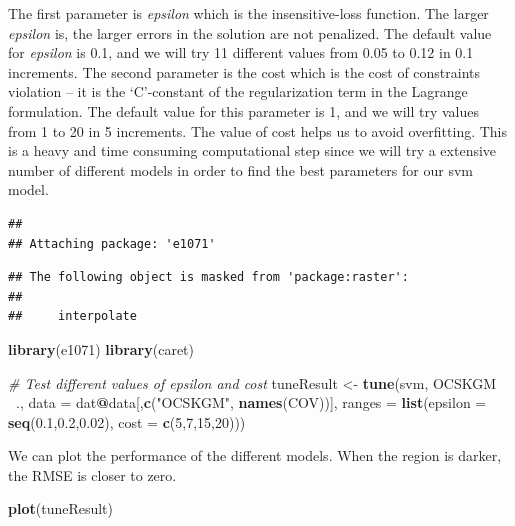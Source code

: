 \documentclass[10pt,b5paper,]{book}
\newenvironment{Shaded}{\begin{snugshade}}{\end{snugshade}}
\newcommand{\CommentTok}[1]{\textcolor[rgb]{0.56,0.35,0.01}{\textit{#1}}}
\newcommand{\DataTypeTok}[1]{\textcolor[rgb]{0.13,0.29,0.53}{#1}}
\newcommand{\DecValTok}[1]{\textcolor[rgb]{0.00,0.00,0.81}{#1}}
\newcommand{\FloatTok}[1]{\textcolor[rgb]{0.00,0.00,0.81}{#1}}
\newcommand{\KeywordTok}[1]{\textcolor[rgb]{0.13,0.29,0.53}{\textbf{#1}}}
\newcommand{\NormalTok}[1]{#1}
\newcommand{\OperatorTok}[1]{\textcolor[rgb]{0.81,0.36,0.00}{\textbf{#1}}}
\newcommand{\StringTok}[1]{\textcolor[rgb]{0.31,0.60,0.02}{#1}}
\theoremstyle{definition}
\theoremstyle{definition}
\theoremstyle{definition}
\theoremstyle{remark}
\begin{document}
The first parameter is \emph{epsilon} which is the insensitive-loss
function. The larger \emph{epsilon} is, the larger errors in the
solution are not penalized. The default value for \emph{epsilon} is 0.1,
and we will try 11 different values from 0.05 to 0.12 in 0.1 increments.
The second parameter is the cost which is the cost of constraints
violation -- it is the `C'-constant of the regularization term in the
Lagrange formulation. The default value for this parameter is 1, and we
will try values from 1 to 20 in 5 increments. The value of cost helps us
to avoid overfitting. This is a heavy and time consuming computational
step since we will try a extensive number of different models in order
to find the best parameters for our svm model.

\begin{verbatim}
## 
## Attaching package: 'e1071'
\end{verbatim}

\begin{verbatim}
## The following object is masked from 'package:raster':
## 
##     interpolate
\end{verbatim}

\begin{Shaded}
\begin{Highlighting}[]
\KeywordTok{library}\NormalTok{(e1071)}
\KeywordTok{library}\NormalTok{(caret)}

\CommentTok{# Test different values of epsilon and cost}
\NormalTok{  tuneResult <-}\StringTok{ }\KeywordTok{tune}\NormalTok{(svm, OCSKGM }\OperatorTok{~}\NormalTok{.,  }\DataTypeTok{data =}\NormalTok{ dat}\OperatorTok{@}\NormalTok{data[,}\KeywordTok{c}\NormalTok{(}\StringTok{"OCSKGM"}\NormalTok{,}
                                                         \KeywordTok{names}\NormalTok{(COV))],}
                     \DataTypeTok{ranges =} \KeywordTok{list}\NormalTok{(}\DataTypeTok{epsilon =} \KeywordTok{seq}\NormalTok{(}\FloatTok{0.1}\NormalTok{,}\FloatTok{0.2}\NormalTok{,}\FloatTok{0.02}\NormalTok{),}
                                   \DataTypeTok{cost =} \KeywordTok{c}\NormalTok{(}\DecValTok{5}\NormalTok{,}\DecValTok{7}\NormalTok{,}\DecValTok{15}\NormalTok{,}\DecValTok{20}\NormalTok{)))}
\end{Highlighting}
\end{Shaded}

We can plot the performance of the different models. When the region is
darker, the RMSE is closer to zero.

\begin{Shaded}
\begin{Highlighting}[]
\KeywordTok{plot}\NormalTok{(tuneResult)}
\end{Highlighting}
\end{Shaded}
\end{document}
